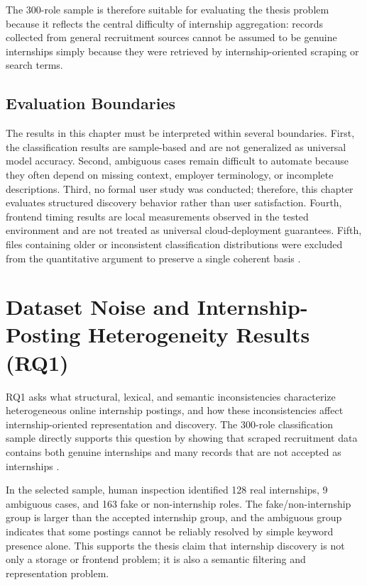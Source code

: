 The 300-role sample is therefore suitable for evaluating the thesis problem because it reflects the central
difficulty of internship aggregation: records collected from general recruitment sources cannot be assumed
to be genuine internships simply because they were retrieved by internship-oriented scraping or search
terms.

\subsection{Evaluation Boundaries}

The results in this chapter must be interpreted within several boundaries. First, the classification results are
sample-based and are not generalized as universal model accuracy. Second, ambiguous cases
remain difficult to automate because they often depend on missing context, employer terminology, or
incomplete descriptions. Third, no formal user study was conducted; therefore, this chapter evaluates
structured discovery behavior rather than user satisfaction. Fourth, frontend timing results are local
measurements observed in the tested environment and are not treated as universal cloud-deployment
guarantees. Fifth, files containing older or inconsistent classification distributions were excluded from the
quantitative argument to preserve a single coherent basis \cite{wohlin2012experimentation, jain1991art}.


\section{Dataset Noise and Internship-Posting Heterogeneity Results (RQ1)}

RQ1 asks what structural, lexical, and semantic inconsistencies characterize heterogeneous online
internship postings, and how these inconsistencies affect internship-oriented representation and discovery.
The 300-role classification sample directly supports this question by showing that scraped recruitment data
contains both genuine internships and many records that are not accepted as internships \cite{batini2009methodologies}.

In the selected sample, human inspection identified 128 real internships, 9 ambiguous cases, and 163 fake
or non-internship roles. The fake/non-internship group is larger than the accepted internship group, and the
ambiguous group indicates that some postings cannot be reliably resolved by simple keyword presence
alone. This supports the thesis claim that internship discovery is not only a storage or frontend problem; it
is also a semantic filtering and representation problem.


